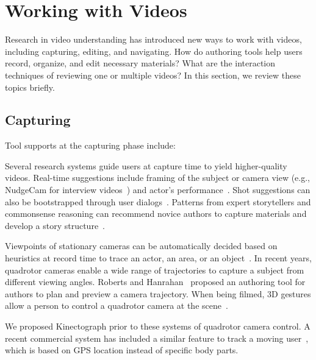 
\section{Working with Videos}
\label{related_videos}

Research in video understanding has introduced new ways to work with videos, including capturing, editing, and navigating. How do authoring tools help users record, organize, and edit necessary materials? What are the interaction techniques of reviewing one or multiple videos? In this section, we review these topics briefly.


\subsection{Capturing}
Tool supports at the capturing phase include:

Several research systems guide users at capture time to yield higher-quality videos. Real-time suggestions include framing of the subject or camera view (e.g., NudgeCam for interview videos~\cite{Carter:2010}) and actor's performance~\cite{Heer:2004ba,Davis:2003cu}. Shot suggestions can also be bootstrapped through user dialogs~\cite{Adams:2005}.
%
Patterns from expert storytellers and commonsense reasoning can recommend novice authors to capture materials and develop a story structure~\cite{Barry:2003:MCC:957013.957152,Kim:2015:MSN:2702123.2702507}.

Viewpoints of stationary cameras can be automatically decided based on heuristics at record time to trace an actor, an area, or an object~\cite{Ranjan:2008,Okumura:2011tr}.
%
In recent years, quadrotor cameras enable a wide range of trajectories to capture a subject from different viewing angles. Roberts and Hanrahan~\cite{Roberts:2016:GDF:2897824.2925980} proposed an authoring tool for authors to plan and preview a camera trajectory. When being filmed, 3D gestures allow a person to control a quadrotor camera at the scene~\cite{Cauchard:2015:DME:2750858.2805823,Pfeil:2013:EGM:2449396.2449429}.

We proposed Kinectograph prior to these systems of quadrotor camera control. A recent commercial system has included a similar feature to track a moving user~\cite{HexoDrone}, which is based on GPS location instead of specific body parts.

